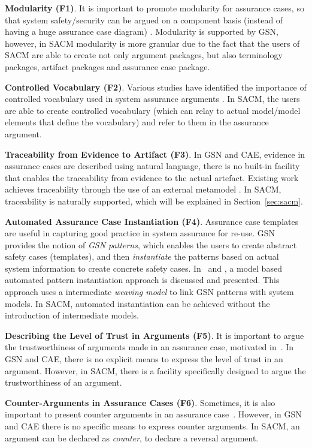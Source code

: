 \textbf{Modularity (F1)}. It is important to promote modularity for assurance cases, so that system safety/security can be argued on a component basis (instead of having a huge assurance case diagram) \cite{despotou2008investigating}. 
Modularity is supported by GSN, however, in SACM modularity is more granular due to the fact that the users of SACM are able to create not only argument packages, but also terminology packages, artifact packages and assurance case package.

\textbf{Controlled Vocabulary (F2)}. Various studies have identified the importance of controlled vocabulary used in system assurance arguments \cite{luo2015safety, attwood2014use}. 
In SACM, the users are able to create controlled vocabulary (which can relay to actual model/model elements that define the vocabulary) and refer to them in the assurance argument. 

\textbf{Traceability from Evidence to Artifact (F3)}. In GSN and CAE, evidence in assurance cases are described using natural language, there is no built-in facility that enables the traceability from evidence to the actual artefact. 
Existing work achieves traceability through the use of an external metamodel \cite{taguchi2014linking}.
In SACM, traceability is naturally supported, which will be explained in Section~\ref{sec:sacm}.

\textbf{Automated Assurance Case Instantiation (F4)}. Assurance case templates are useful in capturing good practice in system assurance for re-use.
GSN provides the notion of \textit{GSN patterns}, which enables the users to create abstract safety cases (templates), and then \textit{instantiate} the patterns based on actual system information to create concrete safety cases. 
In~\cite{hawkins2015need} and \cite{hawkins2015weaving}, a model based automated pattern instantiation approach is discussed and presented. 
This approach uses a intermediate \textit{weaving model} to link GSN patterns with system models. 
In SACM, automated instantiation can be achieved without the introduction of intermediate models.

\textbf{Describing the Level of Trust in Arguments (F5)}. It is important to argue the trustworthiness of arguments made in an assurance case, motivated in~\cite{fenn2005putting}. 
In GSN and CAE, there is no explicit means to express the level of trust in an argument. 
However, in SACM, there is a facility specifically designed to argue the trustworthiness of an argument.

\textbf{Counter-Arguments in Assurance Cases (F6)}. Sometimes, it is also important to present counter arguments in an assurance case~\cite{armstrong2004deconstruction}.
However, in GSN and CAE there is no specific means to express counter arguments. 
In SACM, an argument can be declared as \textit{counter}, to declare a reversal argument.

